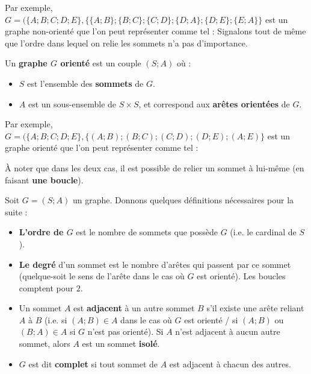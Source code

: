 	\begin{tip}[Exemple]
		\contentwidth[big]
		Par exemple, $G = (\{A; B; C; D; E\}, \{\{A; B\}; \{B; C\}; \{C; D\}; \{D; A\}; \{D; E\}; \{E; A\}\}$ est un graphe non-orienté que l'on peut représenter comme tel :
		Signalons tout de même que l'ordre dans lequel on relie les sommets n'a pas d'importance.
	\end{tip}
	
	\begin{formula}
		Un \textbf{graphe $G$ orienté} est un couple $(S; A)$ où :
		\begin{itemize}
			\item $S$ est l'ensemble des \textbf{sommets} de $G$.
			\item $A$ est un sous-ensemble de $S \times S$, et correspond aux \textbf{arêtes orientées} de $G$.
		\end{itemize}
	\end{formula}
	
	\begin{tip}[Exemple]
		\contentwidth[big]
		Par exemple, $G = (\{A; B; C; D; E\}, \{(A; B); (B; C); (C; D); (D; E); (A; E)\}$ est un graphe orienté que l'on peut représenter comme tel :
	\end{tip}
	
	\begin{tip}
		À noter que dans les deux cas, il est possible de relier un sommet à lui-même (en faisant \textbf{une boucle}).
	\end{tip}
	
	\begin{formula}[Définition]
		Soit $G = (S; A)$ un graphe. Donnons quelques définitions nécessaires pour la suite :
		\begin{itemize}
			\item \textbf{L'ordre de $G$} est le nombre de sommets que possède $G$ (i.e. le cardinal de $S$).
			\item \textbf{Le degré} d'un sommet est le nombre d'arêtes qui passent par ce sommet (quelque-soit le sens de l'arête dans le cas où $G$ est orienté). Les boucles comptent pour $2$.
			\item Un sommet $A$ est \textbf{adjacent} à un autre sommet $B$ s'il existe une arête reliant $A$ à $B$ (i.e. si $(A; B) \in A$ dans le cas où $G$ est orienté / si $(A; B)$ ou $(B; A) \in A$ si $G$ n'est pas orienté). Si $A$ n'est adjacent à aucun autre sommet, alors $A$ est un sommet \textbf{isolé}.
			\item $G$ est dit \textbf{complet} si tout sommet de $A$ est adjacent à chacun des autres.
		\end{itemize}
	\end{formula}
	

